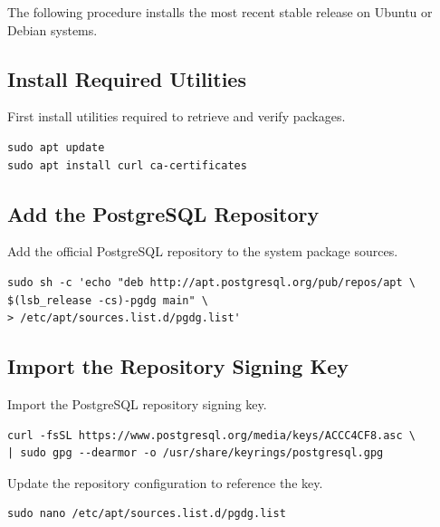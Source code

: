 The following procedure installs the most recent stable release on
Ubuntu or Debian systems.

\subsection{Install Required Utilities}
First install utilities required to retrieve and verify packages.

\begin{lstlisting}[basicstyle=\footnotesize\ttfamily]
sudo apt update
sudo apt install curl ca-certificates
\end{lstlisting}

\subsection{Add the PostgreSQL Repository}
Add the official PostgreSQL repository to the system package sources.

\begin{lstlisting}[basicstyle=\footnotesize\ttfamily]
sudo sh -c 'echo "deb http://apt.postgresql.org/pub/repos/apt \
$(lsb_release -cs)-pgdg main" \
> /etc/apt/sources.list.d/pgdg.list'
\end{lstlisting}

\subsection{Import the Repository Signing Key}
Import the PostgreSQL repository signing key.

\begin{lstlisting}[basicstyle=\footnotesize\ttfamily]
curl -fsSL https://www.postgresql.org/media/keys/ACCC4CF8.asc \
| sudo gpg --dearmor -o /usr/share/keyrings/postgresql.gpg
\end{lstlisting}

Update the repository configuration to reference the key.

\begin{lstlisting}[basicstyle=\footnotesize\ttfamily]
sudo nano /etc/apt/sources.list.d/pgdg.list
\end{lstlisting}

